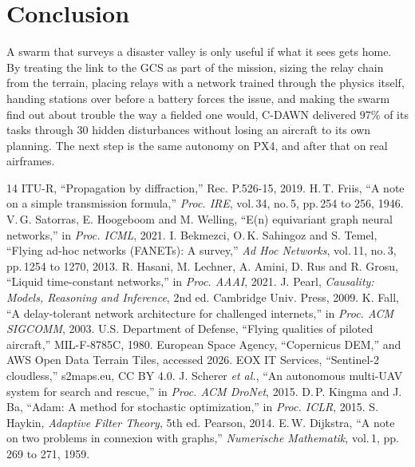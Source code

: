 \documentclass[10pt,a4paper,twocolumn]{article}
\begin{document}
\section{Conclusion}
A swarm that surveys a disaster valley is only useful if what it sees gets home. By treating the link to the GCS as part of the mission, sizing the relay chain from the terrain, placing relays with a network trained through the physics itself, handing stations over before a battery forces the issue, and making the swarm find out about trouble the way a fielded one would, C-DAWN delivered 97\% of its tasks through 30 hidden disturbances without losing an aircraft to its own planning. The next step is the same autonomy on PX4, and after that on real airframes.

{\footnotesize
\setlength{\itemsep}{0pt}
\renewcommand{\refname}{References}
\begin{thebibliography}{14}\setlength{\itemsep}{0.5pt}
 ITU-R, ``Propagation by diffraction,'' Rec. P.526-15, 2019.
 H.\,T. Friis, ``A note on a simple transmission formula,'' \emph{Proc. IRE}, vol.\,34, no.\,5, pp.\,254 to 256, 1946.
 V.\,G. Satorras, E. Hoogeboom and M. Welling, ``E(n) equivariant graph neural networks,'' in \emph{Proc. ICML}, 2021.
 I. Bekmezci, O.\,K. Sahingoz and S. Temel, ``Flying ad-hoc networks (FANETs): A survey,'' \emph{Ad Hoc Networks}, vol.\,11, no.\,3, pp.\,1254 to 1270, 2013.
 R. Hasani, M. Lechner, A. Amini, D. Rus and R. Grosu, ``Liquid time-constant networks,'' in \emph{Proc. AAAI}, 2021.
 J. Pearl, \emph{Causality: Models, Reasoning and Inference}, 2nd ed. Cambridge Univ. Press, 2009.
 K. Fall, ``A delay-tolerant network architecture for challenged internets,'' in \emph{Proc. ACM SIGCOMM}, 2003.
 U.S. Department of Defense, ``Flying qualities of piloted aircraft,'' MIL-F-8785C, 1980.
 European Space Agency, ``Copernicus DEM,'' and AWS Open Data Terrain Tiles, accessed 2026.
 EOX IT Services, ``Sentinel-2 cloudless,'' s2maps.eu, CC BY 4.0.
 J. Scherer \emph{et al.}, ``An autonomous multi-UAV system for search and rescue,'' in \emph{Proc. ACM DroNet}, 2015.
 D.\,P. Kingma and J. Ba, ``Adam: A method for stochastic optimization,'' in \emph{Proc. ICLR}, 2015.
 S. Haykin, \emph{Adaptive Filter Theory}, 5th ed. Pearson, 2014.
 E.\,W. Dijkstra, ``A note on two problems in connexion with graphs,'' \emph{Numerische Mathematik}, vol.\,1, pp.\,269 to 271, 1959.
\end{thebibliography}}
\end{document}
